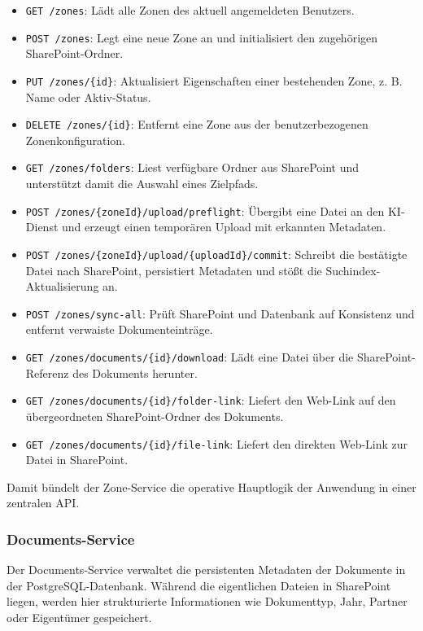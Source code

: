 \begin{itemize}
    \item \texttt{GET /zones}: Lädt alle Zonen des aktuell angemeldeten Benutzers.
    \item \texttt{POST /zones}: Legt eine neue Zone an und initialisiert den zugehörigen SharePoint-Ordner.
    \item \texttt{PUT /zones/\{id\}}: Aktualisiert Eigenschaften einer bestehenden Zone, z. B. Name oder Aktiv-Status.
    \item \texttt{DELETE /zones/\{id\}}: Entfernt eine Zone aus der benutzerbezogenen Zonenkonfiguration.
    \item \texttt{GET /zones/folders}: Liest verfügbare Ordner aus SharePoint und unterstützt damit die Auswahl eines Zielpfads.
    \item \texttt{POST /zones/\{zoneId\}/upload/preflight}: Übergibt eine Datei an den KI-Dienst und erzeugt einen temporären Upload mit erkannten Metadaten.
    \item \texttt{POST /zones/\{zoneId\}/upload/\{uploadId\}/commit}: Schreibt die bestätigte Datei nach SharePoint, persistiert Metadaten und stößt die Suchindex-Aktualisierung an.
    \item \texttt{POST /zones/sync-all}: Prüft SharePoint und Datenbank auf Konsistenz und entfernt verwaiste Dokumenteinträge.
    \item \texttt{GET /zones/documents/\{id\}/download}: Lädt eine Datei über die SharePoint-Referenz des Dokuments herunter.
    \item \texttt{GET /zones/documents/\{id\}/folder-link}: Liefert den Web-Link auf den übergeordneten SharePoint-Ordner des Dokuments.
    \item \texttt{GET /zones/documents/\{id\}/file-link}: Liefert den direkten Web-Link zur Datei in SharePoint.
\end{itemize}

Damit bündelt der Zone-Service die operative Hauptlogik der Anwendung in einer
zentralen API.

\subsubsection{Documents-Service}

Der Documents-Service verwaltet die persistenten Metadaten der Dokumente in der
PostgreSQL-Datenbank. Während die eigentlichen Dateien in SharePoint liegen,
werden hier strukturierte Informationen wie Dokumenttyp, Jahr, Partner oder
Eigentümer gespeichert.

